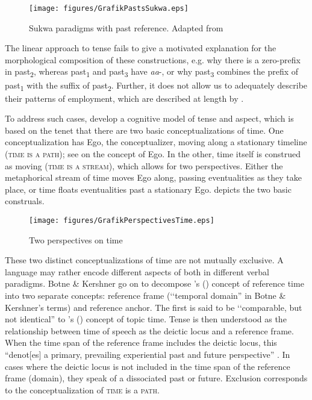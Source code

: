 \begin{figure}[hbt]
\begin{center}
\texttt{[image: figures/GrafikPastsSukwa.eps]}
\caption{Sukwa paradigms with past reference. Adapted from \citet[94]{KershnerT2002}}
\label{FigureSukwaPasts}
\end{center}
\end{figure}

The linear approach to tense fails to give a motivated explanation for the morphological composition of these constructions, e.g. why there is a zero-prefix in past\textsubscript{2}, whereas past\textsubscript{1} and past\textsubscript{3} have \textit{aa}-, or why past\textsubscript{3} combines the prefix of past\textsubscript{1} with the suffix of past\textsubscript{2}. Further, it does not allow us to adequately describe their patterns of employment, which are described at length by \citet{KershnerT2002}.

To address such cases, \citet{BotneRKershnerT2008} develop a cognitive model of tense and aspect, which is based on the tenet that there are two basic conceptualizations of time. One conceptualization has Ego, the conceptualizer, moving along a stationary timeline (\textsc{time is a path}); see \citet[84f]{EvansVGreenM2006} on the concept of Ego. In the other, time itself is construed as moving (\textsc{time is a stream}), which allows for two perspectives. Either the metaphorical stream of time moves Ego along, passing eventualities as they take place, or time floats eventualities past a stationary Ego.  depicts the two basic construals.

\begin{figure}[h]
\begin{center}
\texttt{[image: figures/GrafikPerspectivesTime.eps]}
\caption{Two perspectives on time}
\label{FigurePerspectivesOnTime}
\end{center}
\end{figure}

These two distinct conceptualizations of time are not mutually exclusive. A language may rather encode different aspects of both in different verbal paradigms. Botne \& Kershner go on to decompose \citeauthor{ReichenbachH1947}'s (\citeyear{ReichenbachH1947}) concept of reference time into two separate concepts: reference frame (\lq\lq temporal domain'' in Botne \& Kershner's terms) and reference anchor. The first is said to be \lq\lq comparable, but not identical'' \citep[152]{BotneRKershnerT2008} to \citeauthor{KleinW1994}'s (\citeyear{KleinW1994}) concept of topic time. Tense is then understood as the relationship between time of speech as the deictic locus and a reference frame. When the time span of the reference frame includes the deictic locus, this ``denot[es] a primary, prevailing experiential past and future perspective'' \citep[153]{BotneRKershnerT2008}. In cases where the deictic locus is not included in the time span of the reference frame (domain), they speak of a dissociated past or future. Exclusion corresponds to the conceptualization of \textsc{time} is a \textsc{path}.

